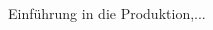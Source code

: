 

\clearpage
{}




\begin{thebibliography}{99}

	
	Einführung in die Produktion,... 	
 	
 	
\end{thebibliography}